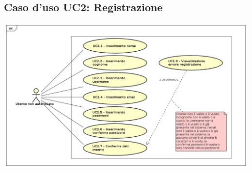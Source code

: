 \newpage
\subsection{Caso d'uso UC2: Registrazione}
\begin{center}
	\includegraphics[scale=0.5]{UML/UC2.png}
\end{center}
